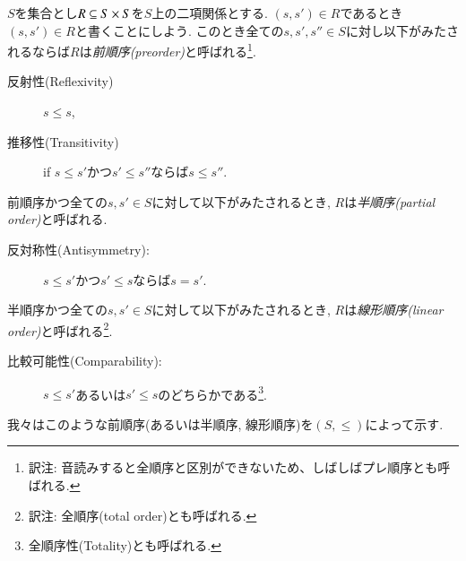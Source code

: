 \begin{definition}\label{def:orders}


$S$を集合とし$R\ss S\times S$を$S$上の二項関係とする. $(s,s')\in R$であるとき$(s,s')\in R$と書くことにしよう. このとき全ての$s,s',s''\in S$に対し以下がみたされるならば$R$は\emph{前順序(preorder)}と呼ばれる\footnote{訳注: 音読みすると全順序と区別ができないため、しばしばプレ順序とも呼ばれる.}.
\begin{description}
\item[反射性(Reflexivity)] $s\leq s$,
\item[推移性(Transitivity)] if $s\leq s'$かつ$s'\leq s''$ならば$s\leq s''$.
\end{description}
前順序かつ全ての$s,s'\in S$に対して以下がみたされるとき, $R$は\emph{半順序(partial order)}と呼ばれる.
\begin{description}
\item[反対称性(Antisymmetry):] $s\leq s'$かつ$s'\leq s$ならば$s=s'$.
\end{description}
半順序かつ全ての$s,s'\in S$に対して以下がみたされるとき, $R$は\emph{線形順序(linear order)}と呼ばれる\footnote{訳注: 全順序(total order)とも呼ばれる.}.
\begin{description}
\item[比較可能性(Comparability):] $s\leq s'$あるいは$s'\leq s$のどちらかである\footnote{全順序性(Totality)とも呼ばれる.}.
\end{description}
我々はこのような前順序(あるいは半順序, 線形順序)を$(S,\leq)$によって示す.

\end{definition}

